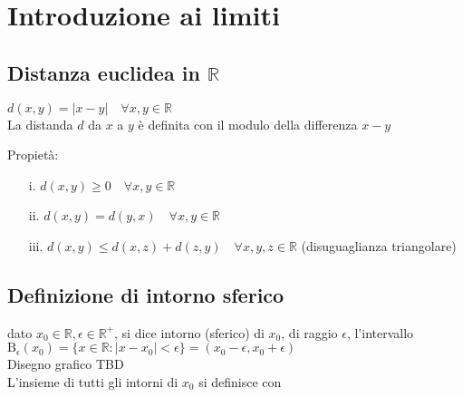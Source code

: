 \chapter{Introduzione ai limiti}

\section{Distanza euclidea in $\mathbb{R}$}
$d(x,y) = | x-y | \quad \forall x,y \in \mathbb{R}$\\
La distanda $d$ da $x$ a $y$ è definita con il modulo della differenza $x-y$

Propietà:

\begin{enumerate}
	\item[i. ] $d(x,y) \geq 0 \quad \forall x,y \in \mathbb{R}$
	\item[ii. ] $d(x,y) = d(y,x) \quad \forall x,y \in \mathbb{R}$
	\item[iii. ] $d(x,y) \leq d(x,z) + d(z,y) \quad \forall x,y,z \in \mathbb{R} $  (disuguaglianza triangolare)
\end{enumerate}

\section{Definizione di intorno sferico}
dato $x_0 \in \mathbb{R} , \epsilon \in \mathbb{R}^+$, si dice intorno (sferico) di $x_0$, di raggio $\epsilon$, l'intervallo\\
$\mathrm{B}_\epsilon (x_0) = \{x \in \mathbb{R} : | x-x_0 |<\epsilon \} = (x_0 - \epsilon, x_0 + \epsilon)$\\

Disegno grafico TBD\\

L'insieme di tutti gli intorni di $x_0$ si definisce con\\
